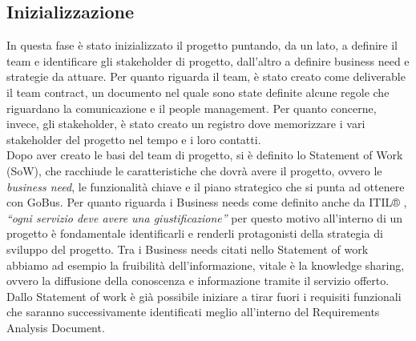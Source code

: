 \subsection{Inizializzazione}
In questa fase \`{e} stato inizializzato il progetto puntando, da un lato, a definire il team e identificare gli stakeholder di progetto, dall\rq altro a definire business need e strategie da attuare. Per quanto riguarda il team, \`{e} stato creato come deliverable il team contract, un documento nel quale sono state definite alcune regole che riguardano la comunicazione e il people management. Per quanto concerne, invece, gli stakeholder, \`{e} stato creato un registro dove memorizzare i vari stakeholder del progetto nel tempo e i loro contatti.\\
Dopo aver creato le basi del team di progetto, si \`{e} definito lo Statement of Work (SoW), che racchiude le caratteristiche che dovr\`{a} avere il progetto, ovvero le \emph{business need}, le funzionalit\`{a} chiave e il piano strategico che si punta ad ottenere con GoBus. Per quanto riguarda i Business needs come definito anche da ITIL® \cite{ITIL}, \emph{``ogni servizio deve avere una giustificazione''} per questo motivo all\rq interno di un progetto \`{e} fondamentale identificarli e renderli protagonisti della strategia di sviluppo del progetto. Tra i Business needs citati nello Statement of work abbiamo ad esempio la fruibilit\`{a} dell\rq informazione, vitale \`{e} la knowledge sharing, ovvero la diffusione della conoscenza e informazione tramite il servizio offerto. Dallo Statement of work \`{e} gi\`{a} possibile iniziare a tirar fuori i requisiti funzionali che saranno successivamente identificati meglio all\rq interno del Requirements Analysis Document.

